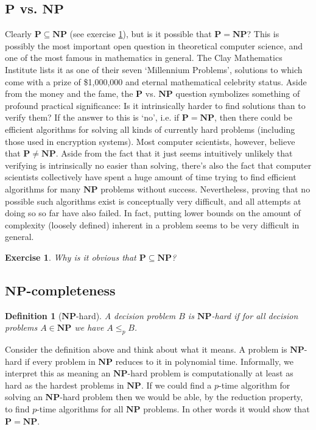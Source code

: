 \documentclass{article}
\theoremstyle{plain}
\newtheorem{definition}[theorem]{Definition}{\bfseries}{\upshape}
\newtheorem{exercise}[theorem]{Exercise}{\bfseries}{\upshape}
\theoremstyle{definition}
\newcommand{\Po}{\mathbf{P}}
\newcommand{\NP}{\mathbf{NP}}
\begin{document}
\subsection{$\Po$ vs. $\NP$}
Clearly $\Po\subseteq \NP$ (see exercise \ref{E:subs}), but is it possible that $\Po=\NP$? This is possibly the most important open question in theoretical computer science, and one of the most famous in mathematics in general. The Clay Mathematics Institute lists it as one of their seven `Millennium Problems', solutions to which come with a prize of \$1,000,000 and eternal mathematical celebrity status. Aside from the money and the fame, the $\Po$ vs. $\NP$ question symbolizes something of profound practical significance: Is it intrinsically harder to find solutions than to verify them? If the answer to this is `no', i.e. if $\Po=\NP$, then there could be efficient algorithms for solving all kinds of currently hard problems (including those used in encryption systems). Most computer scientists, however, believe that $\Po\neq\NP$. Aside from the fact that it just seems intuitively unlikely that verifying is intrinsically no easier than solving, there's also the fact that computer scientists collectively have spent a huge amount of time trying to find efficient algorithms for many $\NP$ problems without success. Nevertheless, proving that no possible such algorithms exist is conceptually very difficult, and all attempts at doing so so far have also failed. In fact, putting lower bounds on the amount of complexity (loosely defined) inherent in a problem seems to be very difficult in general.       

\begin{exercise}\label{E:subs}
Why is it obvious that $\Po\subseteq \NP$?
\end{exercise}  


\subsection{$\NP$-completeness}
\begin{definition}[$\NP$-hard]
A decision problem $B$ is $\NP$-hard if for all decision problems $A\in \NP$ we have $A\leq_p B$. 
\end{definition}

Consider the definition above and think about what it means. A problem is $\NP$-hard if every problem in $\NP$ reduces to it in polynomial time. Informally, we interpret this as meaning an $\NP$-hard problem is computationally at least as hard as the hardest problems in $\NP$. If we could find a $p$-time algorithm for solving an $\NP$-hard problem then we would be able, by the reduction property, to find $p$-time algorithms for all $\NP$ problems. In other words it would show that $\Po=\NP$.
\end{document}
